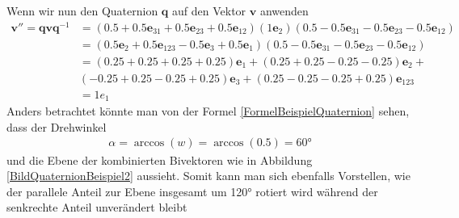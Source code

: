 \begin{beispiel}
	Wenn wir nun den Quaternion $\mathbf{q}$ auf den Vektor $\mathbf{v}$ anwenden
	\begin{align}
		\mathbf{v}'' = \mathbf{qvq}^{-1} &= (0.5 + 0.5\mathbf{e}_{31} + 0.5 \mathbf{e}_{23} + 0.5 \mathbf{e}_{12})(1\mathbf{e}_2)(0.5 - 0.5\mathbf{e}_{31} - 0.5 \mathbf{e}_{23} - 0.5 \mathbf{e}_{12})\\ 
		&= (0.5\mathbf{e}_2 + 0.5 \mathbf{e}_{123} - 0.5 \mathbf{e}_3 + 0.5 \mathbf{e}_1)(0.5 - 0.5\mathbf{e}_{31} - 0.5 \mathbf{e}_{23} - 0.5 \mathbf{e}_{12})\\
		&= (0.25 + 0.25 + 0.25 + 0.25)\mathbf{e}_1 + (0.25 + 0.25 - 0.25 - 0.25)\mathbf{e}_2 +\\ &(-0.25 + 0.25 - 0.25 + 0.25)\mathbf{e}_3 + (0.25 - 0.25 - 0.25 + 0.25)\mathbf{e}_{123}\\
		&= 1e_1 
	\end{align}
	Anders betrachtet könnte man von der Formel \eqref{FormelBeispielQuaternion} sehen, dass der Drehwinkel
	\begin{align}
		\alpha = \arccos(w) = \arccos(0.5) = 60°
	\end{align}
	und die Ebene der kombinierten Bivektoren wie in Abbildung \ref{BildQuaternionBeispiel2} aussieht.
	Somit kann man sich ebenfalls Vorstellen, wie der parallele Anteil zur Ebene insgesamt um 120° rotiert wird während der senkrechte Anteil unverändert bleibt
\end{beispiel}

